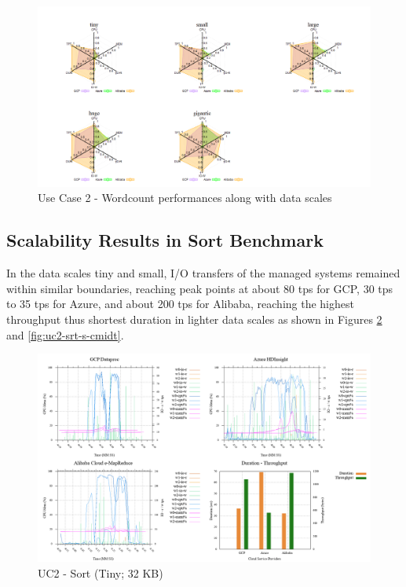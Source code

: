 \documentclass[review]{elsarticle}
\begin{document}
\begin{figure}[p]
	\caption{Use Case 2 - Wordcount performances along with data scales}
	\label{fig:uc2-wrdcnt-new}
	\includegraphics[width=\textwidth]{uc2-wrdcnt-new}
	\centering
\end{figure}


\subsection{Scalability Results in Sort Benchmark}
In the data scales tiny and small, I/O transfers of the managed systems remained within similar boundaries, reaching peak points at about 80 tps for GCP, 30 tps to 35 tps for Azure, and about 200 tps for Alibaba, reaching the highest throughput thus shortest duration in lighter data scales as shown in Figures \ref{fig:uc2-srt-t-cmidt} and \ref{fig:uc2-srt-s-cmidt}. 

\begin{figure}[p]
	\caption{UC2 - Sort (Tiny; 32 KB)}
	\label{fig:uc2-srt-t-cmidt}
	\includegraphics[width=\textwidth]{uc2-srt-t-cmidt}
	\centering
\end{figure}
\end{document}
